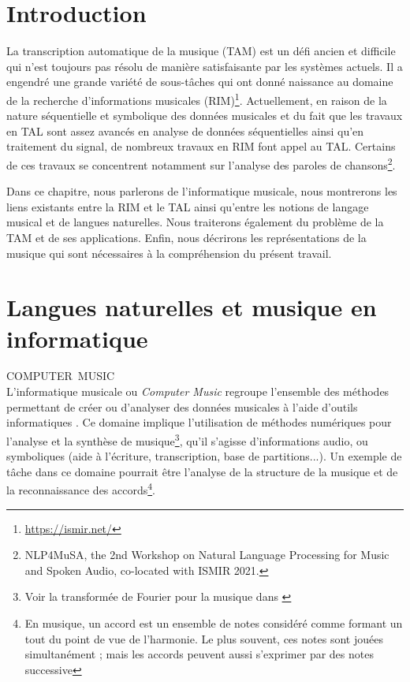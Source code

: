 \section*{Introduction}
La transcription automatique de la musique (TAM) est un défi ancien
\cite{first_one} et difficile qui n’est toujours pas résolu de manière
satisfaisante par les systèmes actuels. Il a engendré une
grande variété de sous-tâches qui ont donné naissance au domaine de la
recherche d’informations musicales (RIM)\footnote{\url{https://ismir.net/}}.
Actuellement, en raison de la nature séquentielle et symbolique des données
musicales et du fait que les travaux en TAL sont assez avancés en analyse de
données séquentielles ainsi qu’en traitement du signal, de nombreux travaux en
RIM font appel au TAL. Certains de ces travaux se concentrent notamment sur
l’analyse des paroles de chansons\footnote{NLP4MuSA, the 2nd Workshop on
Natural Language Processing for Music and Spoken Audio, co-located with ISMIR
2021.}.

Dans ce chapitre, nous parlerons de l’informatique musicale, nous montrerons
les liens existants entre la RIM et le TAL ainsi qu’entre les notions de
langage musical et de langues naturelles. Nous traiterons également du problème
de la TAM et de ses applications. Enfin, nous décrirons les représentations de
la musique qui sont nécessaires à la compréhension du présent travail.

\section{Langues naturelles et musique en informatique}
COMPUTER MUSIC\\
L’informatique musicale ou \textit{Computer Music} regroupe l’ensemble des
méthodes permettant de créer ou d’analyser des données musicales à l’aide
d’outils informatiques \cite{book_muller}. Ce domaine implique l’utilisation de
méthodes numériques pour l’analyse et la synthèse de musique\footnote{Voir la
transformée de Fourier pour la musique dans \cite{fourier}}, qu’il s’agisse
d’informations audio, ou symboliques (aide à l’écriture, transcription, base de
partitions...). Un exemple de tâche dans ce domaine pourrait être l’analyse de
la structure de la musique et de la reconnaissance des accords\footnote{En
musique, un accord est un ensemble de notes considéré comme formant un tout du
point de vue de l’harmonie. Le plus souvent, ces notes sont jouées
simultanément ; mais les accords peuvent aussi s’exprimer par des notes
successive}.\\

